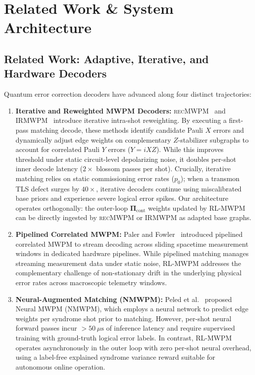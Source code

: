 \documentclass[aps,prxquantum,reprint,superscriptaddress,floatfix,nofootinbib]{revtex4-2}
\begin{document}
\section{Related Work \& System Architecture}
\label{sec:methodology}

\subsection{Related Work: Adaptive, Iterative, and Hardware Decoders}
\label{subsec:related_work}

Quantum error correction decoders have advanced along four distinct trajectories:
\begin{enumerate}
    \item \textbf{Iterative and Reweighted MWPM Decoders:} \textsc{recMWPM}~\cite{cowtan2023correlated} and \textsc{IRMWPM}~\cite{tian2025iterative} introduce iterative intra-shot reweighting. By executing a first-pass matching decode, these methods identify candidate Pauli $X$ errors and dynamically adjust edge weights on complementary $Z$-stabilizer subgraphs to account for correlated Pauli $Y$ errors ($Y = iXZ$). While this improves threshold under static circuit-level depolarizing noise, it doubles per-shot inner decode latency ($2\times$ blossom passes per shot). Crucially, iterative matching relies on static commissioning error rates ($p_0$); when a transmon TLS defect surges by $40\times$, iterative decoders continue using miscalibrated base priors and experience severe logical error spikes. Our architecture operates orthogonally: the outer-loop $\mathbf{\Pi}_{\text{cont}}$ weights updated by RL-MWPM can be directly ingested by \textsc{recMWPM} or \textsc{IRMWPM} as adapted base graphs.
    \item \textbf{Pipelined Correlated MWPM:} Paler and Fowler~\cite{paler2023pipelined} introduced pipelined correlated MWPM to stream decoding across sliding spacetime measurement windows in dedicated hardware pipelines. While pipelined matching manages streaming measurement data under static noise, RL-MWPM addresses the complementary challenge of non-stationary drift in the underlying physical error rates across macroscopic telemetry windows.
    \item \textbf{Neural-Augmented Matching (NMWPM):} Peled et al.~\cite{peled2026neural} proposed Neural MWPM (NMWPM), which employs a neural network to predict edge weights per syndrome shot prior to matching. However, per-shot neural forward passes incur $>50\ \mu\text{s}$ of inference latency and require supervised training with ground-truth logical error labels. In contrast, RL-MWPM operates asynchronously in the outer loop with zero per-shot neural overhead, using a label-free explained syndrome variance reward suitable for autonomous online operation.

\end{enumerate}
\end{document}
